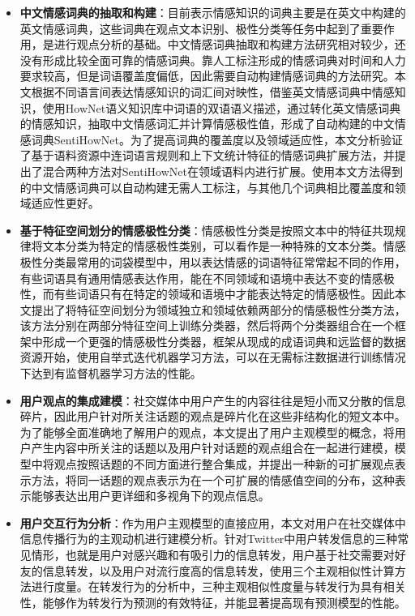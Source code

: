 \begin{cabstract}
\begin{itemize}
\item \textbf{中文情感词典的抽取和构建}：目前表示情感知识的词典主要是在英文中构建的英文情感词典，这些词典在观点文本识别、极性分类等任务中起到了重要作用，是进行观点分析的基础。中文情感词典抽取和构建方法研究相对较少，还没有形成比较全面可靠的情感词典。靠人工标注形成的情感词典对时间和人力要求较高，但是词语覆盖度偏低，因此需要自动构建情感词典的方法研究。本文根据不同语言间表达情感知识的词汇间对映性，借鉴英文情感词典中情感知识，使用HowNet语义知识库中词语的双语语义描述，通过转化英文情感词典的情感知识，抽取中文情感词汇并计算情感极性值，形成了自动构建的中文情感词典SentiHowNet。为了提高词典的覆盖度以及领域适应性，本文分析验证了基于语料资源中连词语言规则和上下文统计特征的情感词典扩展方法，并提出了混合两种方法对SentiHowNet在领域语料内进行扩展。使用本文方法得到的中文情感词典可以自动构建无需人工标注，与其他几个词典相比覆盖度和领域适应性更好。
\item \textbf{基于特征空间划分的情感极性分类}：情感极性分类是按照文本中的特征共现规律将文本分类为特定的情感极性类别，可以看作是一种特殊的文本分类。情感极性分类最常用的词袋模型中，用以表达情感的词语特征常常起不同的作用，有些词语具有通用情感表达作用，能在不同领域和语境中表达不变的情感极性，而有些词语只有在特定的领域和语境中才能表达特定的情感极性。因此本文提出了将特征空间划分为领域独立和领域依赖两部分的情感极性分类方法，该方法分别在两部分特征空间上训练分类器，然后将两个分类器组合在一个框架中形成一个更强的情感极性分类器，框架从现成的成语词典和远监督的数据资源开始，使用自举式迭代机器学习方法，可以在无需标注数据进行训练情况下达到有监督机器学习方法的性能。
\item \textbf{用户观点的集成建模}：社交媒体中用户产生的内容往往是短小而又分散的信息碎片，因此用户针对所关注话题的观点是碎片化在这些非结构化的短文本中。为了能够全面准确地了解用户的观点，本文提出了用户主观模型的概念，将用户产生内容中所关注的话题以及用户针对话题的观点组合在一起进行建模，模型中将观点按照话题的不同方面进行整合集成，并提出一种新的可扩展观点表示方法，将同一话题的观点表示为在一个可扩展的情感值空间的分布，这种表示能够表达出用户更详细和多视角下的观点信息。
\item \textbf{用户交互行为分析}：作为用户主观模型的直接应用，本文对用户在社交媒体中信息传播行为的主观动机进行建模分析。针对Twitter中用户转发信息的三种常见情形，也就是用户对感兴趣和有吸引力的信息转发，用户基于社交需要对好友的信息转发，以及用户对流行度高的信息转发，使用三个主观相似性计算方法进行度量。在转发行为的分析中，三种主观相似性度量与转发行为具有相关性，能够作为转发行为预测的有效特征，并能显著提高现有预测模型的性能。
\end{itemize}


\end{cabstract}
